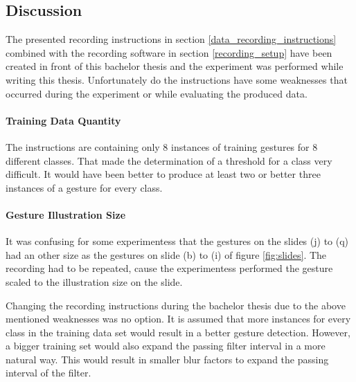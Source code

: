 \subsection{Discussion} \label{discussion} \label{instructions_review}
The presented recording instructions in section \ref{data_recording_instructions} combined with the recording software
in section \ref{recording_setup} have been created in front of this bachelor thesis and the experiment was performed
while writing this thesis. Unfortunately do the instructions have some weaknesses that occurred during the experiment or
while evaluating the produced data.

\paragraph{Training Data Quantity} The instructions are containing only 8 instances of training gestures for 8 different
classes. That made the determination of a threshold for a class very difficult. It would have been better to produce at
least two or better three instances of a gesture for every class.

\paragraph{Gesture Illustration Size} It was confusing for some experimentess that the gestures on the slides (j) to (q)
had an other size as the gestures on slide (b) to (i) of figure \ref{fig:slides}. The recording had to be repeated,
cause the experimentess performed the gesture scaled to the illustration size on the slide.

Changing the recording instructions during the bachelor thesis due to the above mentioned weaknesses was no option. It
is assumed that more instances for every class in the training data set would result in a better gesture detection.
However, a bigger training set would also expand the passing filter interval in a more natural way. This would result
in smaller blur factors to expand the passing interval of the filter.
